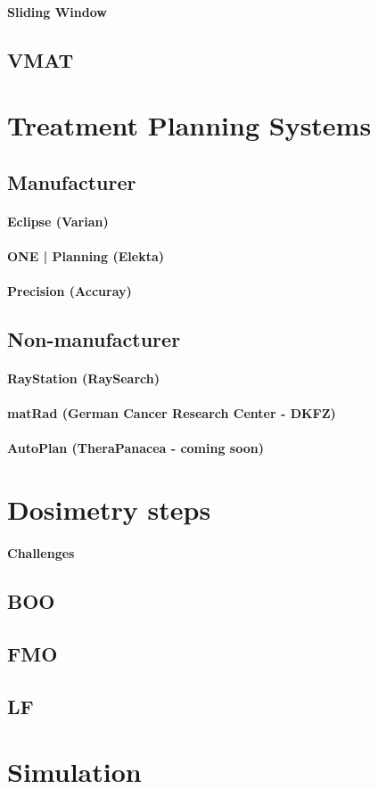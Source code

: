 \paragraph{Sliding Window}
\subsection{VMAT}

\section{Treatment Planning Systems}
\subsection{Manufacturer}
\paragraph{Eclipse (Varian)}
\paragraph{ONE | Planning (Elekta)}
\paragraph{Precision (Accuray)}
\subsection{Non-manufacturer}
\paragraph{RayStation (RaySearch)}
\paragraph{matRad (German Cancer Research Center - DKFZ)}
\paragraph{AutoPlan (TheraPanacea - coming soon)}

\section{Dosimetry steps}
\paragraph{Challenges}
\subsection{BOO}
\subsection{FMO}
\subsection{LF}

\section{Simulation}
